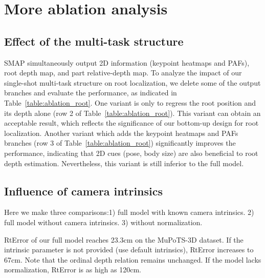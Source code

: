 \documentclass[runningheads]{llncs}
\begin{document}
\section{More ablation analysis}
\subsection{Effect of the multi-task structure}
SMAP simultaneously output 2D information (keypoint heatmaps and PAFs), root depth map, and part relative-depth map. To analyze the impact of our single-shot multi-task structure on root localization, we delete some of the output branches and evaluate the performance, as indicated in Table~\ref{table:ablation_root}. One variant is only to regress the root position and its depth alone (row 2 of Table~\ref{table:ablation_root}). This variant can obtain an acceptable result, which reflects the significance of our bottom-up design for root localization. Another variant which adds the keypoint heatmaps and PAFs branches (row 3 of Table~\ref{table:ablation_root}) significantly improves the performance, indicating that 2D cues (pose, body size) are also beneficial to root depth estimation. Nevertheless, this variant is still inferior to the full model. 

\subsection{Influence of camera intrinsics}
Here we make three comparisons:1) full model with known camera intrinsics. 2) full model without camera intrinsics. 3) without normalization. 

RtError of our full model reaches 23.3cm on the MuPoTS-3D dataset. If the intrinsic parameter is not provided (use default intrinsics), RtError increases to 67cm. Note that the ordinal depth relation remains unchanged. If the model lacks normalization, RtError is as high as 120cm. 
\end{document}
